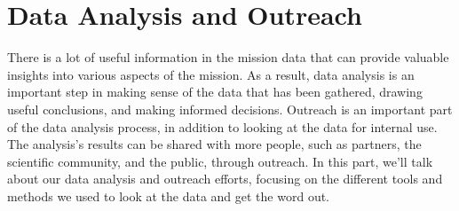 \section{Data Analysis and Outreach}
There is a lot of useful information in the mission data that can provide valuable insights into various aspects of the mission. As a result, data analysis is an important step in making sense of the data that has been gathered, drawing useful conclusions, and making informed decisions. Outreach is an important part of the data analysis process, in addition to looking at the data for internal use. The analysis's results can be shared with more people, such as partners, the scientific community, and the public, through outreach. In this part, we'll talk about our data analysis and outreach efforts, focusing on the different tools and methods we used to look at the data and get the word out.



